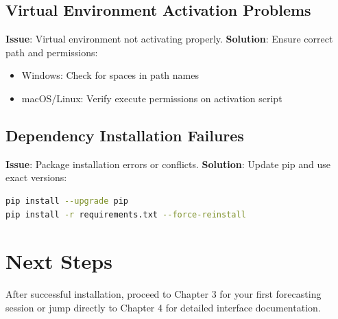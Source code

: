 \subsection{Virtual Environment Activation Problems}

\textbf{Issue}: Virtual environment not activating properly.
\textbf{Solution}: Ensure correct path and permissions:
\begin{itemize}
    \item Windows: Check for spaces in path names
    \item macOS/Linux: Verify execute permissions on activation script
\end{itemize}

\subsection{Dependency Installation Failures}

\textbf{Issue}: Package installation errors or conflicts.
\textbf{Solution}: Update pip and use exact versions:
\begin{lstlisting}[language=bash]
pip install --upgrade pip
pip install -r requirements.txt --force-reinstall
\end{lstlisting}

\section{Next Steps}

After successful installation, proceed to Chapter 3 for your first forecasting session or jump directly to Chapter 4 for detailed interface documentation.